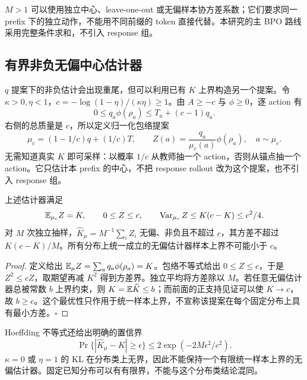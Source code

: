 $M>1$ 可以使用独立中心、leave-one-out 或无偏样本协方差系数；它们要求同一 prefix 下的独立动作，不能用不同前缀的 token 直接代替。本研究的主 BPO 路线采用完整条件求和，不引入 response 组。
\subsection{有界非负无偏中心估计器}

$q$ 提案下的非负估计会出现重尾，但可以利用已有 $K$ 上界构造另一个提案。令 $\kappa>0,\eta<1$，$c=-\log(1-\eta)/(\kappa\eta)\ge1$。由 $A\ge-c$ 与 $\phi\ge0$，逐 action 有
\begin{equation}
 0\le q_a\phi(\rho_a)\le T_a+(c-1)q_a.
\end{equation}
右侧的总质量是 $c$，所以定义归一化包络提案
\begin{equation}
 \mu_c=(1-1/c)q+(1/c)T,\qquad
 Z(a)=\frac{q_a}{\mu_c(a)}\phi(\rho_a),\quad a\sim\mu_c.
 \label{eq:center-bounded-mixture-estimator}
\end{equation}
无需知道真实 $K$ 即可采样：以概率 $1/c$ 从教师抽一个 action，否则从锚点抽一个 action。它只估计本 prefix 的中心，不把 response rollout 改为这个提案，也不引入 response 组。

\begin{theorem}[中心估计的最小统一样本上界]
\label{thm:center-bounded-estimator}
上述估计器满足
\begin{equation}
 \mathbb E_{\mu_c}Z=K,\qquad0\le Z\le c,\qquad
 \operatorname{Var}_{\mu_c}Z\le K(c-K)\le c^2/4.
\end{equation}
对 $M$ 次独立抽样，$\widehat K_\mu=M^{-1}\sum_iZ_i$ 无偏、非负且不超过 $c$，其方差不超过 $K(c-K)/M$。所有分布上统一成立的无偏估计器样本上界不可能小于 $c$。
\end{theorem}

\begin{proof}
定义给出 $\mathbb E_\mu Z=\sum_aq_a\phi(\rho_a)=K$。包络不等式给出 $0\le Z\le c$，于是 $Z^2\le cZ$，取期望再减 $K^2$ 得到方差界。独立平均将方差除以 $M$。若任意无偏估计器总被常数 $b$ 上界约束，则 $K=\mathbb E\widehat K\le b$；而前面的正支持见证可以使 $K\to c$，故 $b\ge c$。这个最优性只作用于统一样本上界，不宣称该提案在每个固定分布上具有最小方差。\hfill$\square$
\end{proof}

Hoeffding 不等式还给出明确的置信界
\begin{equation}
 \Pr\{ |\widehat K_\mu-K|\ge\epsilon\}
 \le2\exp(-2M\epsilon^2/c^2).
\end{equation}
$\kappa=0$ 或 $\eta=1$ 的 KL 在分布类上无界，因此不能保持一个有限统一样本上界的无偏估计器。固定已知分布可以有有限界，不能与这个分布类结论混同。

